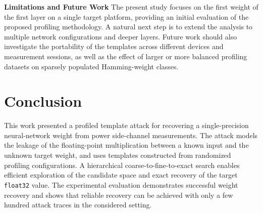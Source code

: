 \documentclass[conference]{IEEEtran}
\begin{document}
\noindent
\textbf{Limitations and Future Work}
The present study focuses on the first weight of the first layer on a single target platform, providing an initial evaluation of the proposed profiling methodology.
A natural next step is to extend the analysis to multiple network configurations and deeper layers.
Future work should also investigate the portability of the templates across different devices and measurement sessions, as well as the effect of larger or more balanced profiling datasets on sparsely populated Hamming-weight classes.

\section{Conclusion}
\label{sec:conclusion}

This work presented a profiled template attack for recovering a single-precision neural-network weight from power side-channel measurements.
The attack models the leakage of the floating-point multiplication between a known input and the unknown target weight, and uses templates constructed from randomized profiling configurations.
A hierarchical coarse-to-fine-to-exact search enables efficient exploration of the candidate space and exact recovery of the target \texttt{float32} value.
The experimental evaluation demonstrates successful weight recovery and shows that reliable recovery can be achieved with only a few hundred attack traces in the considered setting.
%




\end{document}
